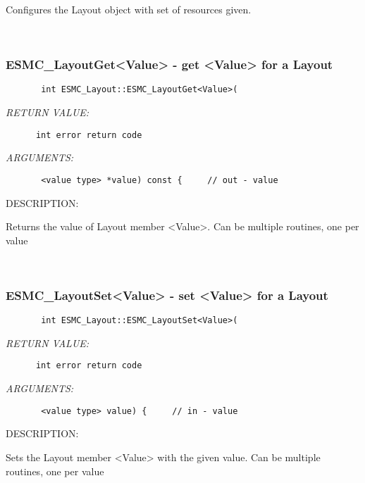       Configures the Layout object with set of resources given.
   
 
\mbox{}\hrulefill\ 
 
\subsubsection{ESMC\_LayoutGet<Value> - get <Value> for a Layout}


  
\begin{verbatim}       int ESMC_Layout::ESMC_LayoutGet<Value>(\end{verbatim}{\em RETURN VALUE:}
\begin{verbatim}      int error return code\end{verbatim}{\em ARGUMENTS:}
\begin{verbatim}       <value type> *value) const {     // out - value\end{verbatim}
{\sf DESCRIPTION:\\ }


       Returns the value of Layout member <Value>.
       Can be multiple routines, one per value
   
 
\mbox{}\hrulefill\ 
 
\subsubsection{ESMC\_LayoutSet<Value> - set <Value> for a Layout}


  
\begin{verbatim}       int ESMC_Layout::ESMC_LayoutSet<Value>(\end{verbatim}{\em RETURN VALUE:}
\begin{verbatim}      int error return code\end{verbatim}{\em ARGUMENTS:}
\begin{verbatim}       <value type> value) {     // in - value\end{verbatim}
{\sf DESCRIPTION:\\ }


       Sets the Layout member <Value> with the given value.
       Can be multiple routines, one per value
   
 

